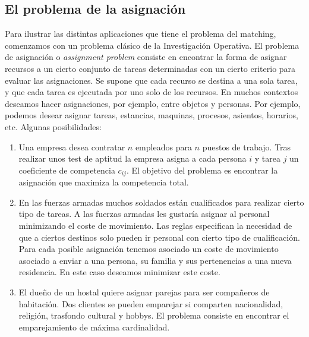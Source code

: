 \documentclass[twoside,a4paper,openright,12pt]{book}
\begin{document}
\subsection{El problema de la asignación}
Para ilustrar las distintas aplicaciones que tiene el problema del matching, comenzamos con un problema clásico de la Investigación Operativa. El problema de asignación o \textit{assignment problem} consiste en encontrar la forma de asignar recursos a un cierto conjunto de tareas determinadas con un cierto criterio para evaluar las asignaciones. Se supone que cada recurso se destina a una sola tarea, y que cada tarea es ejecutada por uno solo de los recursos. En muchos contextos deseamos hacer asignaciones, por ejemplo, entre objetos y personas. Por ejemplo, podemos desear asignar tareas, estancias, maquinas, procesos, asientos, horarios, etc. Algunas posibilidades:
\begin{enumerate}
\item Una empresa desea contratar $n$ empleados para $n$ puestos de trabajo. Tras realizar unos test de aptitud la empresa asigna a cada persona $i$ y tarea $j$ un coeficiente de competencia $c_{ij}$. El objetivo del problema es encontrar la asignación que maximiza la competencia total.
\item En las fuerzas armadas muchos soldados están cualificados para realizar cierto tipo de tareas. A las fuerzas armadas les gustaría asignar al personal minimizando el coste de movimiento. Las reglas especifican la necesidad de que a ciertos destinos solo pueden ir personal con cierto tipo de cualificación. Para cada posible asignación tenemos asociado un coste de movimiento asociado a enviar a una persona, su familia y sus pertenencias a una nueva residencia. En este caso deseamos minimizar este coste.
\item El dueño de un hostal quiere asignar parejas para ser compañeros de habitación. Dos clientes se pueden emparejar si comparten nacionalidad, religión, trasfondo cultural y hobbys. El problema consiste en encontrar el emparejamiento de máxima cardinalidad.
\end{enumerate}
\end{document}
